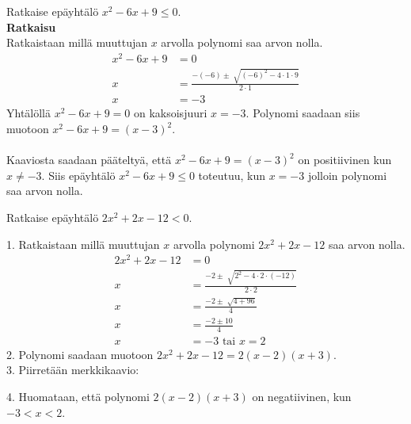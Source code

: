 \begin{esimerkki}
Ratkaise epäyhtälö $x^2-6x+9 \leq 0$. \\
\textbf{Ratkaisu} \\
Ratkaistaan millä muuttujan $x$ arvolla polynomi saa arvon nolla.
\begin{align*}
x^2-6x+9&=0 \\
x&=\frac{-(-6) \pm \sqrt[]{(-6)^2-4 \cdot 1 \cdot 9}}{2 \cdot 1} \\
x&=-3
\end{align*}
Yhtälöllä $x^2-6x+9=0$ on kaksoisjuuri $x=-3$. 
Polynomi saadaan siis muotoon $x^2-6x+9=(x-3)^2$. \\
 \\
Kaaviosta saadaan pääteltyä, että $x^2-6x+9=(x-3)^2$ on positiivinen kun $x \neq -3$. Siis epäyhtälö $x^2-6x+9 \leq 0$ toteutuu, kun $x=-3$ jolloin polynomi saa arvon nolla. 
\end{esimerkki}
\begin{esimerkki}
Ratkaise epäyhtälö $2x^2+2x-12<0$. 
\end{esimerkki}
1. Ratkaistaan millä muuttujan $x$ arvolla polynomi $2x^2+2x-12$ saa arvon nolla.
\begin{align*}
2x^2+2x-12&=0 \\
x&=\frac{-2 \pm \sqrt[]{2^2-4 \cdot 2 \cdot (-12)}}{2 \cdot 2} \\
x&=\frac{-2 \pm \sqrt[]{4+96}}{4} \\
x&=\frac{-2 \pm 10}{4} \\
x&=-3 \text{ tai } x = 2
\end{align*}
2. Polynomi saadaan muotoon $2x^2+2x-12=2(x-2)(x+3)$.  \\
3. Piirretään merkkikaavio:
\begin{center}
\begin{merkkikaavio}{2}


	\merkkikaavioMerkki{$-$}
	\merkkikaavioMerkki{$-$}
	\merkkikaavioMerkki{$+$}
\merkkikaavioUusirivi
	\merkkikaavioMerkki{$-$}
	\merkkikaavioMerkki{$+$}
	\merkkikaavioMerkki{$+$}
\merkkikaavioUusiriviKaksoisviiva
	\merkkikaavioMerkki{$+$}
	\merkkikaavioMerkki{$-$}
	\merkkikaavioMerkki{$+$}
\end{merkkikaavio}
\end{center}

4. Huomataan, että polynomi $2(x-2)(x+3)$ on negatiivinen, kun $-3<x<2$. 
